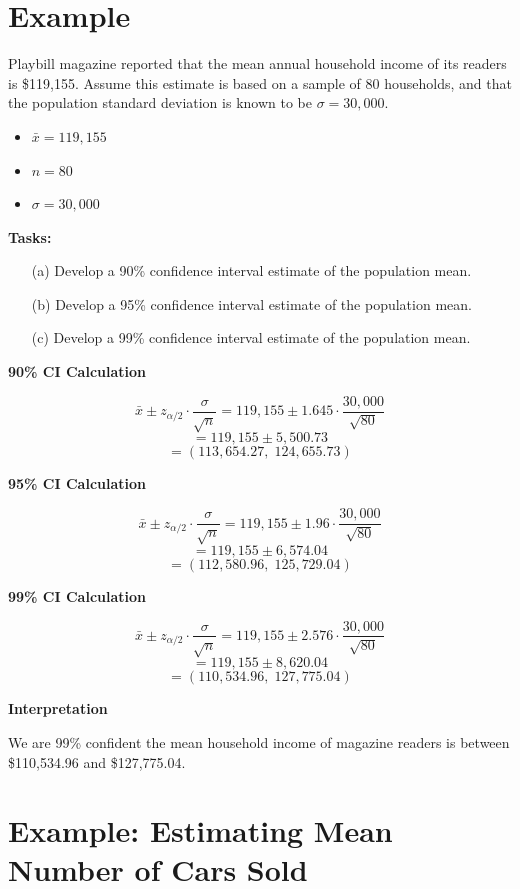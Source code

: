 \section*{Example}

Playbill magazine reported that the mean annual household income of its readers is \$119{,}155. Assume this estimate is based on a sample of 80 households, and that the population standard deviation is known to be $\sigma = 30{,}000$.

\begin{itemize}
  \item $\bar{x} = 119{,}155$
  \item $n = 80$
  \item $\sigma = 30{,}000$
\end{itemize}

\textbf{Tasks:}
\begin{enumerate}
  \item[(a)] Develop a 90\% confidence interval estimate of the population mean.
  \item[(b)] Develop a 95\% confidence interval estimate of the population mean.
  \item[(c)] Develop a 99\% confidence interval estimate of the population mean.
\end{enumerate}



\textbf{90\% CI Calculation}

\[
\bar{x} \pm z_{\alpha/2} \cdot \frac{\sigma}{\sqrt{n}} = 119{,}155 \pm 1.645 \cdot \frac{30{,}000}{\sqrt{80}}
\]
\[
= 119{,}155 \pm 5{,}500.73
\]
\[
= (113{,}654.27, \; 124{,}655.73)
\]

\textbf{95\% CI Calculation}

\[
\bar{x} \pm z_{\alpha/2} \cdot \frac{\sigma}{\sqrt{n}} = 119{,}155 \pm 1.96 \cdot \frac{30{,}000}{\sqrt{80}}
\]
\[
= 119{,}155 \pm 6{,}574.04
\]
\[
= (112{,}580.96, \; 125{,}729.04)
\]


\textbf{99\% CI Calculation}

\[
\bar{x} \pm z_{\alpha/2} \cdot \frac{\sigma}{\sqrt{n}} = 119{,}155 \pm 2.576 \cdot \frac{30{,}000}{\sqrt{80}}
\]
\[
= 119{,}155 \pm 8{,}620.04
\]
\[
= (110{,}534.96, \; 127{,}775.04)
\]


\textbf{Interpretation}


We are 99\% confident the mean household income of magazine readers is between \$110{,}534.96 and \$127{,}775.04.

\section*{Example: Estimating Mean Number of Cars Sold}

